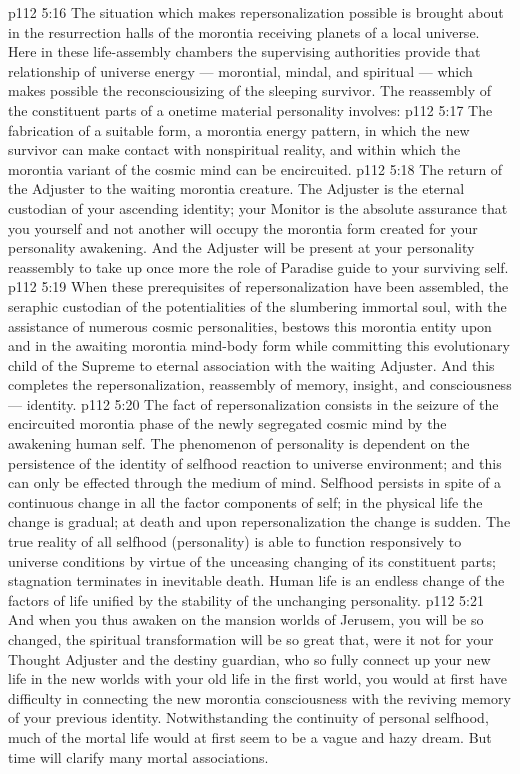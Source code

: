 \vs p112 5:16 \pc The situation which makes repersonalization possible is brought about in the resurrection halls of the morontia receiving planets of a local universe. Here in these life\hyp{}assembly chambers the supervising authorities provide that relationship of universe energy --- morontial, mindal, and spiritual --- which makes possible the reconsciousizing of the sleeping survivor. The reassembly of the constituent parts of a onetime material personality involves:
\vs p112 5:17 \bibnobreakspace The fabrication of a suitable form, a morontia energy pattern, in which the new survivor can make contact with nonspiritual reality, and within which the morontia variant of the cosmic mind can be encircuited.
\vs p112 5:18 \pc {}\bibnobreakspace The return of the Adjuster to the waiting morontia creature. The Adjuster is the eternal custodian of your ascending identity; your Monitor is the absolute assurance that you yourself and not another will occupy the morontia form created for your personality awakening. And the Adjuster will be present at your personality reassembly to take up once more the role of Paradise guide to your surviving self.
\vs p112 5:19 \pc {}\bibnobreakspace When these prerequisites of repersonalization have been assembled, the seraphic custodian of the potentialities of the slumbering immortal soul, with the assistance of numerous cosmic personalities, bestows this morontia entity upon and in the awaiting morontia mind\hyp{}body form while committing this evolutionary child of the Supreme to eternal association with the waiting Adjuster. And this completes the repersonalization, reassembly of memory, insight, and consciousness --- identity.
\vs p112 5:20 \pc The fact of repersonalization consists in the seizure of the encircuited morontia phase of the newly segregated cosmic mind by the awakening human self. The phenomenon of personality is dependent on the persistence of the identity of selfhood reaction to universe environment; and this can only be effected through the medium of mind. Selfhood persists in spite of a continuous change in all the factor components of self; in the physical life the change is gradual; at death and upon repersonalization the change is sudden. The true reality of all selfhood (personality) is able to function responsively to universe conditions by virtue of the unceasing changing of its constituent parts; stagnation terminates in inevitable death. Human life is an endless change of the factors of life unified by the stability of the unchanging personality.
\vs p112 5:21 And when you thus awaken on the mansion worlds of Jerusem, you will be so changed, the spiritual transformation will be so great that, were it not for your Thought Adjuster and the destiny guardian, who so fully connect up your new life in the new worlds with your old life in the first world, you would at first have difficulty in connecting the new morontia consciousness with the reviving memory of your previous identity. Notwithstanding the continuity of personal selfhood, much of the mortal life would at first seem to be a vague and hazy dream. But time will clarify many mortal associations.

